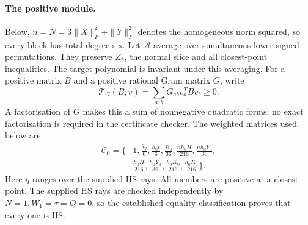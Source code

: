 \paragraph{The positive module.}
Below, $n=N=3\|X\|_F^2+\|Y\|_F^2$ denotes the homogeneous norm squared, so every block has total degree six.
Let $\mathcal A$ average over simultaneous lower signed permutations.
They preserve $Z_*$, the normal slice and all closest-point inequalities.
The target polynomial is invariant under this averaging.
For a positive matrix $B$ and a positive rational Gram matrix $G$, write
\[
 \mathcal T_G(B;v)=\sum_{a,b}G_{ab}v_a^TBv_b\ge0.
\]
A factorisation of $G$ makes this a sum of nonnegative quadratic forms;
no exact factorisation is required in the certificate checker.
The weighted matrices used below are
\begin{equation}\label{eq:fqe-global-module}
 \begin{split}
 \mathcal C_0=\bigg\{&1,\frac{g_\eta}6,\frac{h_0t}6,\frac{B_0}{36},
       \frac{nh_0H}{216},\frac{nh_0Y_3}{36},\\
 &\frac{h_0H}{216},\frac{h_0Y_3}{36},
       \frac{h_0K_0}{216},\frac{h_0K_1}{216}\bigg\}.
 \end{split}
\end{equation}
Here $\eta$ ranges over the supplied HS rays. All members are positive at a closest point.
The supplied HS rays are checked independently by $N=1,W_1=\tau=Q=0$,
so the established equality classification proves that every one is HS.

